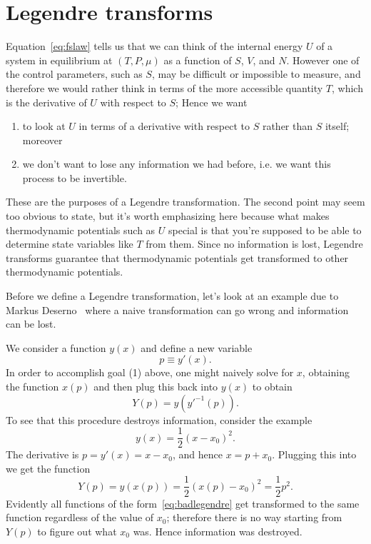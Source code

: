 \section{Legendre transforms}

Equation~\eqref{eq:fslaw} tells us that we can think of the internal energy
$U$ of a system in equilibrium at $(T,P,\mu)$ as a function of $S$, $V$, and
$N$. However one of the control parameters, such as $S$, may be
difficult or impossible to measure, and therefore we would rather
think in terms of the more accessible quantity $T$, which 
is the derivative of $U$ with respect to $S$; 
Hence we want 
\begin{enumerate}
\item to look at $U$ in terms of a derivative with respect to $S$ rather 
      than $S$ itself; moreover 
\item we don't want to lose any information we had before, i.e. we want this
      process to be invertible. 
\end{enumerate}
These are the purposes of a Legendre transformation. The second point 
may seem too obvious to state, but it's worth emphasizing here because 
what makes thermodynamic potentials such as $U$ special is that you're 
supposed to be able to determine state variables like $T$ from them. 
Since no information is lost, Legendre transforms guarantee that 
thermodynamic potentials get transformed to other thermodynamic potentials.

Before we define a Legendre transformation, let's look at an example
due to Markus Deserno~\cite{deserno} where a naive transformation can go
wrong and information can be lost. 
\begin{example*}{}
We consider a function $y(x)$ and define a new variable
\begin{equation}\label{eq:xlegendre}
  p\equiv y'(x).
\end{equation}
In order to accomplish goal (1) above, one might naively solve
 for $x$, obtaining the function $x(p)$
and then plug this back into $y(x)$ to obtain
\begin{equation}
  Y(p)=y\left(y'^{-1}(p)\right).
\end{equation}
To see that this procedure destroys information, consider the example
\begin{equation}\label{eq:badlegendre}
  y(x)=\frac{1}{2}(x-x_0)^2.
\end{equation}
The derivative is $p=y'(x)=x-x_0$, and hence $x=p+x_0$. Plugging this
into  we get the function
\begin{equation}
  Y(p)=y(x(p))=\frac{1}{2}\left(x(p)-x_0\right)^2=\frac{1}{2}p^2.
\end{equation}
Evidently all functions of the form~\eqref{eq:badlegendre} get transformed
to the same function regardless of the value of $x_0$; therefore there is
no way starting from $Y(p)$ to figure out what $x_0$ was. Hence
information was destroyed.
\end{example*}

